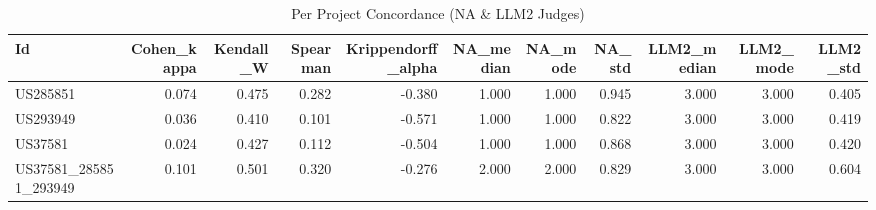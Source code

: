 \begin{table}
\caption{Per Project Concordance (NA & LLM2 Judges)}
\label{tab:per_project_concordance_NA_LLM2_judges}
\begin{tabular}{lrrrrrrrrrr}
\toprule
Id & Cohen_kappa & Kendall_W & Spearman & Krippendorff_alpha & NA_median & NA_mode & NA_std & LLM2_median & LLM2_mode & LLM2_std \\
\midrule
US285851 & 0.074 & 0.475 & 0.282 & -0.380 & 1.000 & 1.000 & 0.945 & 3.000 & 3.000 & 0.405 \\
US293949 & 0.036 & 0.410 & 0.101 & -0.571 & 1.000 & 1.000 & 0.822 & 3.000 & 3.000 & 0.419 \\
US37581 & 0.024 & 0.427 & 0.112 & -0.504 & 1.000 & 1.000 & 0.868 & 3.000 & 3.000 & 0.420 \\
US37581_285851_293949 & 0.101 & 0.501 & 0.320 & -0.276 & 2.000 & 2.000 & 0.829 & 3.000 & 3.000 & 0.604 \\
\bottomrule
\end{tabular}
\end{table}
